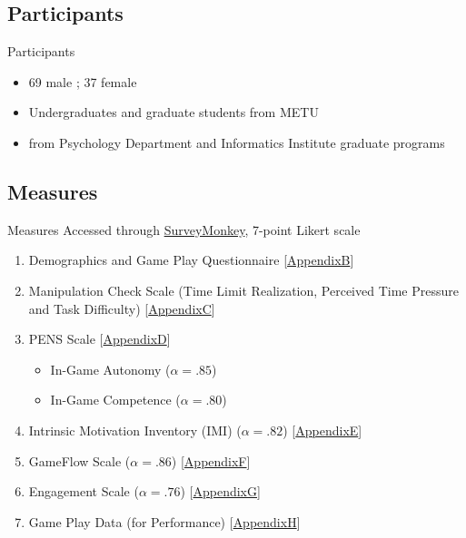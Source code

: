 \documentclass{beamer}
\begin{document}
\subsection{Participants}
\begin{frame}{Participants}
\begin{itemize}
	\item 69 male ; 37 female
	\item Undergraduates and graduate students from METU
	\item from Psychology Department and Informatics Institute graduate programs
\end{itemize}
\end{frame}

\subsection{Measures}
\begin{frame}{Measures}
Accessed through \href {https://www.surveymonkey.com}{SurveyMonkey}, 7-point Likert scale
\begin{enumerate}
\item Demographics and Game Play Questionnaire {\tiny[\hyperlink{appB1}{AppendixB}]}
\item \alert{Manipulation Check Scale} {\tiny(Time Limit Realization, Perceived Time Pressure and Task Difficulty) [\hyperlink{appC}{AppendixC}]}
\item \alert{PENS Scale} {\tiny[\hyperlink{appD}{AppendixD}]}
	\begin{itemize}
		\item In-Game Autonomy ($\alpha = .85$)
		\item In-Game Competence ($\alpha = .80$)
	\end{itemize}
\item \alert{Intrinsic Motivation Inventory} (IMI) ($\alpha = .82$) {\tiny [\hyperlink{appE}{AppendixE}]}
\item \alert{GameFlow Scale} ($\alpha = .86$) {\tiny [\hyperlink{appF}{AppendixF}]}
\item \alert{Engagement Scale} ($\alpha = .76$) {\tiny [\hyperlink{appG}{AppendixG}]}
\item \alert{Game Play Data} (for Performance) {\tiny [\hyperlink{appH}{AppendixH}]}

\end{enumerate}
\end{frame}
\end{document}
